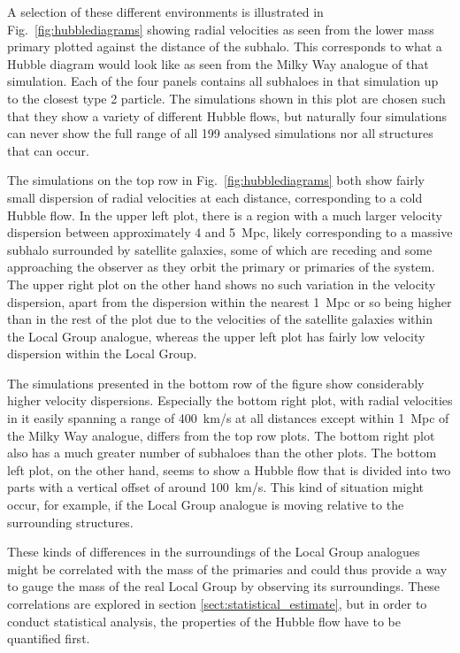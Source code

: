 \documentclass[english, twoside]{HYgradu}
\begin{document}
A selection of these different environments is illustrated in Fig.~\ref{fig:hubblediagrams} showing radial velocities as seen from the lower mass primary plotted against the distance of the subhalo. This corresponds to what a Hubble diagram would look like as seen from the Milky Way analogue of that simulation. Each of the four panels contains all subhaloes in that simulation up to the closest type 2 particle. The simulations shown in this plot are chosen such that they show a variety of different Hubble flows, but naturally four simulations can never show the full range of all 199 analysed simulations nor all structures that can occur.

The simulations on the top row in Fig.~\ref{fig:hubblediagrams} both show fairly small dispersion of radial velocities at each distance, corresponding to a cold Hubble flow. In the upper left plot, there is a region with a much larger velocity dispersion between approximately 4 and 5~Mpc, likely corresponding to a massive subhalo surrounded by satellite galaxies, some of which are receding and some approaching the observer as they orbit the primary or primaries of the system. The upper right plot on the other hand shows no such variation in the velocity dispersion, apart from the dispersion within the nearest 1~Mpc or so being higher than in the rest of the plot due to the velocities of the satellite galaxies within the Local Group analogue, whereas the upper left plot has fairly low velocity dispersion within the Local Group.

The simulations presented in the bottom row of the figure show considerably higher velocity dispersions. Especially the bottom right plot, with radial velocities in it easily spanning a range of 400~km/s at all distances except within 1~Mpc of the Milky Way analogue, differs from the top row plots. The bottom right plot also has a much greater number of subhaloes than the other plots. The bottom left plot, on the other hand, seems to show a Hubble flow that is divided into two parts with a vertical offset of around 100~km/s. This kind of situation might occur, for example, if the Local Group analogue is moving relative to the surrounding structures.

These kinds of differences in the surroundings of the Local Group analogues might be correlated with the mass of the primaries and could thus provide a way to gauge the mass of the real Local Group by observing its surroundings. These correlations are explored in section \ref{sect:statistical_estimate}, but in order to conduct statistical analysis, the properties of the Hubble flow have to be quantified first.
\end{document}
